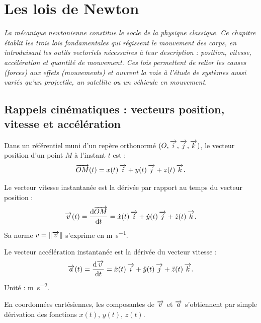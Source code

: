 \chapter{Les lois de Newton}

\textit{La mécanique newtonienne constitue le socle de la physique classique. Ce chapitre établit les trois lois fondamentales qui régissent le mouvement des corps, en introduisant les outils vectoriels nécessaires à leur description : position, vitesse, accélération et quantité de mouvement. Ces lois permettent de relier les causes (forces) aux effets (mouvements) et ouvrent la voie à l’étude de systèmes aussi variés qu’un projectile, un satellite ou un véhicule en mouvement.}

\section{Rappels cinématiques : vecteurs position, vitesse et accélération}

\begin{definition}
Dans un référentiel muni d’un repère orthonormé $(O,\overrightarrow{i},\overrightarrow{j},\overrightarrow{k})$, le vecteur position d’un point $M$ à l’instant $t$ est :
\[
\overrightarrow{OM}(t) = x(t)\,\overrightarrow{i} + y(t)\,\overrightarrow{j} + z(t)\,\overrightarrow{k}.
\]
\end{definition}

\begin{definition}
Le vecteur vitesse instantanée est la dérivée par rapport au temps du vecteur position :
\[
\overrightarrow{v}(t) = \dfrac{\mathrm{d}\overrightarrow{OM}}{\mathrm{d}t} = \dot{x}(t)\,\overrightarrow{i} + \dot{y}(t)\,\overrightarrow{j} + \dot{z}(t)\,\overrightarrow{k}.
\]
Sa norme $v = \|\overrightarrow{v}\|$ s’exprime en \si{\metre\per\second}.
\end{definition}

\begin{definition}
Le vecteur accélération instantanée est la dérivée du vecteur vitesse :
\[
\overrightarrow{a}(t) = \dfrac{\mathrm{d}\overrightarrow{v}}{\mathrm{d}t} = \ddot{x}(t)\,\overrightarrow{i} + \ddot{y}(t)\,\overrightarrow{j} + \ddot{z}(t)\,\overrightarrow{k}.
\]
Unité : \si{\metre\per\second\squared}.
\end{definition}

\begin{remarque}
En coordonnées cartésiennes, les composantes de $\overrightarrow{v}$ et $\overrightarrow{a}$ s’obtiennent par simple dérivation des fonctions $x(t)$, $y(t)$, $z(t)$.
\end{remarque}

